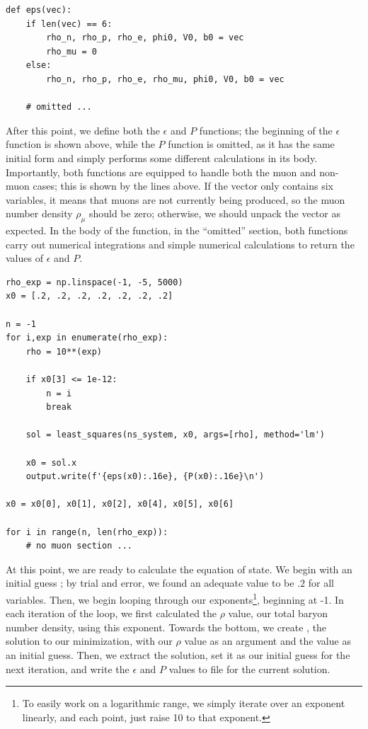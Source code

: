 \begin{lstlisting}
def eps(vec):
    if len(vec) == 6:
        rho_n, rho_p, rho_e, phi0, V0, b0 = vec
        rho_mu = 0
    else:
        rho_n, rho_p, rho_e, rho_mu, phi0, V0, b0 = vec
    
    # omitted ...
\end{lstlisting}

After this point, we define both the $\epsilon$ and $P$ functions; the beginning of the $\epsilon$ function is shown above, while the $P$ function is omitted, as it has the same initial form and simply performs some different calculations in its body. Importantly, both functions are equipped to handle both the muon and non-muon cases; this is shown by the lines above. If the vector only contains six variables, it means that muons are not currently being produced, so the muon number density $\rho_\mu$ should be zero; otherwise, we should unpack the vector as expected. In the body of the function, in the ``omitted'' section, both functions carry out numerical integrations and simple numerical calculations to return the values of $\epsilon$ and $P$.

\begin{lstlisting}
rho_exp = np.linspace(-1, -5, 5000)
x0 = [.2, .2, .2, .2, .2, .2, .2]

n = -1
for i,exp in enumerate(rho_exp):
    rho = 10**(exp)

    if x0[3] <= 1e-12:
        n = i
        break

    sol = least_squares(ns_system, x0, args=[rho], method='lm')

    x0 = sol.x
    output.write(f'{eps(x0):.16e}, {P(x0):.16e}\n')

x0 = x0[0], x0[1], x0[2], x0[4], x0[5], x0[6]

for i in range(n, len(rho_exp)):
    # no muon section ...
\end{lstlisting}

At this point, we are ready to calculate the equation of state. We begin with an initial guess ; by trial and error, we found an adequate value to be $.2$ for all variables. Then, we begin looping through our exponents\footnote{To easily work on a logarithmic range, we simply iterate over an exponent linearly, and each point, just raise 10 to that exponent.}, beginning at -1. In each iteration of the loop, we first calculated the $\rho$ value, our total baryon number density, using this exponent. Towards the bottom, we create , the solution to our  minimization, with our $\rho$ value as an argument and the  value as an initial guess. Then, we extract the solution, set it as our initial guess for the next iteration, and write the $\epsilon$ and $P$ values to file for the current solution.

